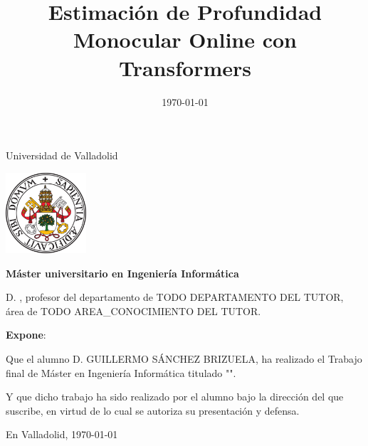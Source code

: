 \documentclass[a4paper,11pt,oneside]{memoir}
\title{Estimación de Profundidad Monocular Online con Transformers}
\author{\nombre}
\date{\today}
\newcommand{\nombre}[0]{GUILLERMO SÁNCHEZ BRIZUELA} %
\newcommand{\depto}[0]{TODO DEPARTAMENTO DEL TUTOR}
\newcommand{\areac}[0]{TODO AREA\_CONOCIMIENTO DEL TUTOR}
\begin{document}
\maketitle



\newpage\null\thispagestyle{empty}\newpage


\thispagestyle{empty}


\noindent
\begin{center}%
	{\noindent\Huge Universidad de Valladolid}\vspace{.5cm}%
	
\begin{center}%
	\includegraphics[height=3cm]{imagenes/escudoUVA} \hspace{1cm}
\end{center}%

	{\noindent\Large \textbf{Máster universitario en Ingeniería Informática}}\vspace{.5cm}%
\end{center}%



\noindent D. \makeatletter\@tutor\makeatother, profesor del departamento de \depto, área de \areac.

\noindent \textbf{Expone}:

\noindent Que el alumno D. \nombre, %
ha realizado el Trabajo final de Máster en Ingeniería Informática titulado "\makeatletter\textsc{\@title{}}\makeatother". 

\noindent Y que dicho trabajo ha sido realizado por el alumno bajo la dirección del que suscribe, en virtud de lo cual se autoriza su presentación y defensa.

\begin{center} %
En Valladolid, {\large \today}
\end{center}

\vfill\vfill\vfill

%
\end{document}
